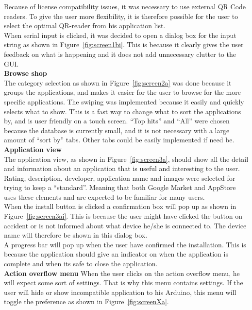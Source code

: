 	Because of license compatibility issues, it was necessary to use external QR Code readers. To give the user more flexibility, it is therefore possible for the user to select the optimal QR-reader from his application list.\\

	When serial input is clicked, it was decided to open a dialog box for the input string as shown in Figure~\ref{fig:screen1bi}. This is because it clearly gives the user feedback on what is happening and it does not add unnecessary clutter to the GUI.\\

	\textbf{Browse shop}\\
	The category selection as shown in Figure~\ref{fig:screen2a} was done because it groups the applications, and makes it easier for the user to browse for the more specific applications. The swiping was implemented because it easily and quickly selects what to show. This is a fast way to change what to sort the applications by, and is user friendly on a touch screen. ``Top hits'' and ``All'' were chosen because the database is currently small, and it is not necessary with a large amount of ``sort by'' tabs. Other tabs could be easily implemented if need be.\\

	\textbf{Application view}\\
	The application view, as shown in Figure~\ref{fig:screen3a}, should show all the detail and information about an application that is useful and interesting to the user. Rating, description, developer, application name and images were selected for trying to keep a ``standard''. Meaning that both Google Market and AppStore uses these elements and are expected to be familiar for many users.\\

	When the install button is clicked a confirmation box will pop up as shown in Figure~\ref{fig:screen3ai}. This is because the user might have clicked the button on accident or is not informed about what device he/she is connected to. The device name will therefore be shown in this dialog box.\\

	A progress bar will pop up when the user have confirmed the installation. This is because the application should give an indicator on when the application is complete and when its safe to close the application. \\

	\textbf{Action overflow menu}
	When the user clicks on the action overflow menu, he will expect some sort of settings. That is why this menu contains settings. If the user will hide or show incompatible application to his Arduino, this menu will toggle the preference as shown in Figure~\ref{fig:screenXa}.\\

